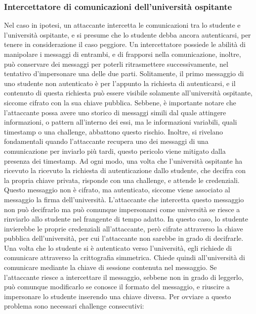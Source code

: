 \documentclass[a4paper,12pt]{article}
\begin{document}
\subsubsection{Intercettatore di comunicazioni dell'università ospitante}
Nel caso in ipotesi, un attaccante intercetta le comunicazioni tra lo studente e l'università ospitante, e si presume che lo studente debba ancora autenticarsi, per tenere in considerazione il caso peggiore. Un intercettatore possiede le abilità di manipolare i messaggi di entrambi, e di frapporsi nella comunicazione, inoltre, può conservare dei messaggi per poterli ritrasmettere successivamente, nel tentativo d'impersonare una delle due parti.
\newline Solitamente, il primo messaggio di uno studente non autenticato è per l'appunto la richiesta di autenticarsi, e il contenuto di questa richiesta può essere visibile solamente all'università ospitante, siccome cifrato con la sua chiave pubblica. Sebbene, è importante notare che l'attaccante possa avere uno storico di messaggi simili dal quale attingere informazioni, o pattern all'interno dei essi, ma le informazioni variabili, quali timestamp o una challenge, abbattono questo rischio. Inoltre, si rivelano fondamentali quando l'attaccante recupera uno dei messaggi di una comunicazione per inviarlo più tardi, questo pericolo viene mitigato dalla presenza dei timestamp.
\newline Ad ogni modo, una volta che l'università ospitante ha ricevuto la ricevuto la richiesta di autenticazione dallo studente, che decifra con la propria chiave privata, risponde con una challenge, e attende le credenziali. Questo messaggio non è cifrato, ma autenticato, siccome viene associato al messaggio la firma dell'università. L'attaccante che intercetta questo messaggio non può decifrarlo ma può comunque impersonarsi come università se riesce a rinviarlo allo studente nel frangente di tempo adatto. In questo caso, lo studente invierebbe le proprie credenziali all'attaccante, però cifrate attraverso la chiave pubblica dell'università, per cui l'attaccante non sarebbe in grado di decifrarle.
\newline Una volta che lo studente si è autenticato verso l'università, egli richiede di comunicare attraverso la crittografia simmetrica. Chiede quindi all'università di comunicare mediante la chiave di sessione contenuta nel messaggio. Se l'attaccante riesce a intercettare il messaggio, sebbene non in grado di leggerlo, può comunque modificarlo se conosce il formato del messaggio, e riuscire a impersonare lo studente inserendo una chiave diversa. Per ovviare a questo problema sono necessari challenge consecutivi:
\end{document}
